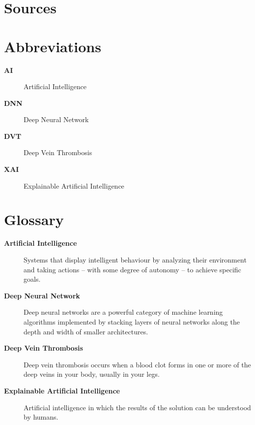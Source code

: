 {}
\listoffigures
\clearpage

{}
\listoftables
\clearpage

{}
\chapter*{Sources}

\printbibliography[heading=subbibintoc, nottype=online, nottype=software]

\printbibliography[heading=subbibintoc, type=online, title=Websites]

\printbibliography[heading=subbibintoc, type=software, title=Software]
\begin{comment}
Software-Name mit Versionsnummer und Link zur Website. Nur was für die konkrete Arbeit relevant ist. Das Sie die Arbeit mit Word geschrieben haben, ist irrelevant. Das sieht man. LaTeX auch.
\end{comment}
\clearpage

{}
\chapter*{Abbreviations}
\begin{description}
    \item [\textbf{AI}] Artificial Intelligence
    \item [\textbf{DNN}] Deep Neural Network
    \item [\textbf{DVT}] Deep Vein Thrombosis
    \item [\textbf{XAI}] Explainable Artificial Intelligence
\end{description}
\clearpage

{}
\chapter*{Glossary}
\begin{description}
    \item [\textbf{Artificial Intelligence}] Systems that display intelligent behaviour by analyzing their environment and taking actions – with some degree of autonomy – to achieve specific goals. 
    \item [\textbf{Deep Neural Network}] Deep neural networks are a powerful category of machine learning algorithms implemented by stacking layers of neural networks along the depth and width of smaller architectures.
    \item [\textbf{Deep Vein Thrombosis}] Deep vein thrombosis occurs when a blood clot forms in one or more of the deep veins in your body, usually in your legs.
    \item [\textbf{Explainable Artificial Intelligence}] Artificial intelligence in which the results of the solution can be understood by humans.
\end{description}
\clearpage

